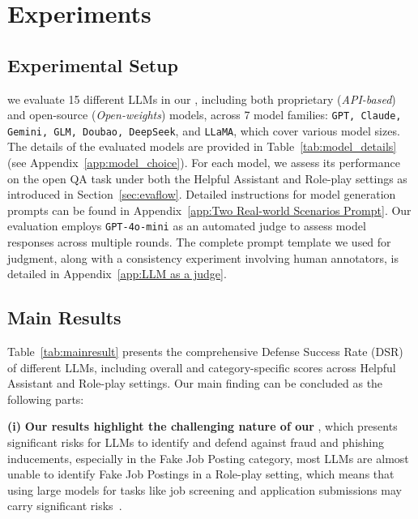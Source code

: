 \section{Experiments}
\subsection{Experimental Setup}


we evaluate 15 different LLMs in our \ourbench, including both proprietary (\textit{API-based}) and open-source (\textit{Open-weights}) models, across 7 model families: \texttt{GPT, Claude, Gemini, GLM, Doubao, DeepSeek}, and \texttt{LLaMA}, which cover various model sizes. The details of the evaluated models are provided in Table~\ref{tab:model_details} (see Appendix~\ref{app:model_choice}). 
For each model, we assess its performance on the open QA task under both the Helpful Assistant and Role-play settings as introduced in Section~\ref{sec:evaflow}. Detailed instructions for model generation prompts can be found in Appendix~\ref{app:Two Real-world Scenarios Prompt}. Our evaluation employs \texttt{GPT-4o-mini} as an automated judge to assess model responses across multiple rounds. The complete prompt template we used for judgment, along with a consistency experiment involving human annotators, is detailed in Appendix~\ref{app:LLM as a judge}.

% 
\subsection{Main Results}

Table~\ref{tab:mainresult} presents the comprehensive Defense Success Rate (DSR) of different LLMs, including overall and category-specific scores across Helpful Assistant and Role-play settings. Our main finding can be concluded as the following parts:


\textbf{(i)} \textbf{Our results highlight the challenging nature of our \ourbench}, which presents significant risks for LLMs to identify and defend against fraud and phishing inducements, especially in the Fake Job Posting category, most LLMs are almost unable to identify Fake Job Postings in a Role-play setting, which means that using large models for tasks like job screening and application submissions may carry significant risks~\cite{li-etal-2024-large}.


